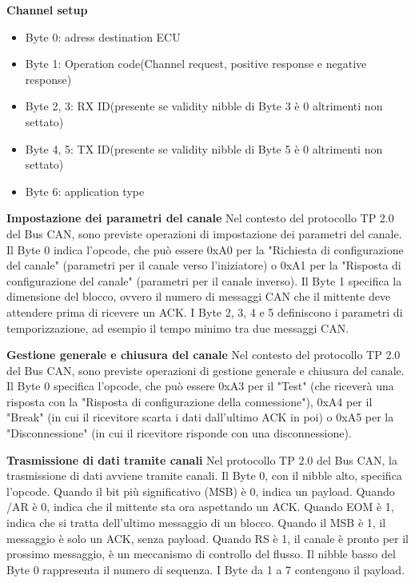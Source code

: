 \textbf{Channel setup}
\begin{itemize}
  \item Byte 0: adress destination ECU
  \item Byte 1: Operation code(Channel request, positive response e negative response)
  \item Byte 2, 3: RX ID(presente se validity nibble di Byte 3 è 0 altrimenti non settato)
  \item Byte 4, 5: TX ID(presente se validity nibble di Byte 5 è 0 altrimenti non settato)
  \item Byte 6: application type
\end{itemize}





\textbf{Impostazione dei parametri del canale}
Nel contesto del protocollo TP 2.0 del Bus CAN, sono previste operazioni di impostazione dei parametri del canale. Il Byte 0 indica l'opcode, che può essere 0xA0 per la "Richiesta di configurazione del canale" (parametri per il canale verso l'iniziatore) o 0xA1 per la "Risposta di configurazione del canale" (parametri per il canale inverso). Il Byte 1 specifica la dimensione del blocco, ovvero il numero di messaggi CAN che il mittente deve attendere prima di ricevere un ACK. I Byte 2, 3, 4 e 5 definiscono i parametri di temporizzazione, ad esempio il tempo minimo tra due messaggi CAN.

\textbf{Gestione generale e chiusura del canale}
Nel contesto del protocollo TP 2.0 del Bus CAN, sono previste operazioni di gestione generale e chiusura del canale. Il Byte 0 specifica l'opcode, che può essere 0xA3 per il "Test" (che riceverà una risposta con la "Risposta di configurazione della connessione"), 0xA4 per il "Break" (in cui il ricevitore scarta i dati dall'ultimo ACK in poi) o 0xA5 per la "Disconnessione" (in cui il ricevitore risponde con una disconnessione).

\textbf{Trasmissione di dati tramite canali}
Nel protocollo TP 2.0 del Bus CAN, la trasmissione di dati avviene tramite canali. Il Byte 0, con il nibble alto, specifica l'opcode. Quando il bit più significativo (MSB) è 0, indica un payload. Quando /AR è 0, indica che il mittente sta ora aspettando un ACK. Quando EOM è 1, indica che si tratta dell'ultimo messaggio di un blocco. Quando il MSB è 1, il messaggio è solo un ACK, senza payload. Quando RS è 1, il canale è pronto per il prossimo messaggio, è un meccanismo di controllo del flusso. Il nibble basso del Byte 0 rappresenta il numero di sequenza. I Byte da 1 a 7 contengono il payload.





